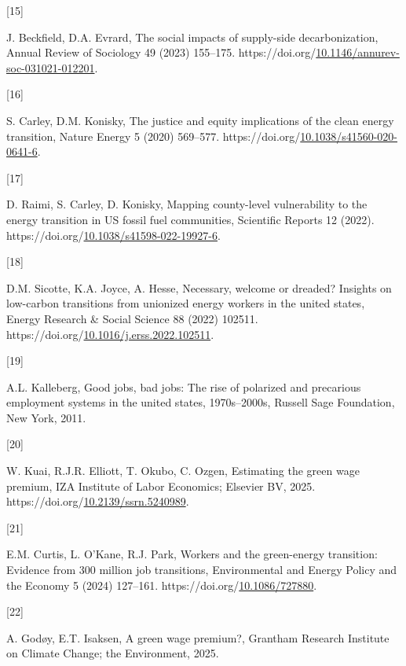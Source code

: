 \documentclass[
  11pt,
]{article}
\newlength{\cslhangindent}
\newlength{\csllabelwidth}
\newenvironment{CSLReferences}[2] %
 {\begin{list}{}{%
  \setlength{\itemindent}{0pt}
  \setlength{\leftmargin}{0pt}
  \setlength{\parsep}{0pt}
  \ifodd #1
   \setlength{\leftmargin}{\cslhangindent}
   \setlength{\itemindent}{-1\cslhangindent}
  \fi
  \setlength{\itemsep}{#2\baselineskip}}}
 {\end{list}}
\newcommand{\CSLLeftMargin}[1]{\parbox[t]{\csllabelwidth}{\strut#1\strut}}
\newcommand{\CSLRightInline}[1]{\parbox[t]{\linewidth - \csllabelwidth}{\strut#1\strut}}
\begin{document}
\begin{CSLReferences}{0}{0}
\CSLLeftMargin{{[}15{]} }%
\CSLRightInline{J. Beckfield, D.A. Evrard, The social impacts of
supply-side decarbonization, Annual Review of Sociology 49 (2023)
155--175.
https://doi.org/\href{https://doi.org/10.1146/annurev-soc-031021-012201}{10.1146/annurev-soc-031021-012201}.}

\CSLLeftMargin{{[}16{]} }%
\CSLRightInline{S. Carley, D.M. Konisky, The justice and equity
implications of the clean energy transition, Nature Energy 5 (2020)
569--577.
https://doi.org/\href{https://doi.org/10.1038/s41560-020-0641-6}{10.1038/s41560-020-0641-6}.}

\CSLLeftMargin{{[}17{]} }%
\CSLRightInline{D. Raimi, S. Carley, D. Konisky, Mapping county-level
vulnerability to the energy transition in US fossil fuel communities,
Scientific Reports 12 (2022).
https://doi.org/\href{https://doi.org/10.1038/s41598-022-19927-6}{10.1038/s41598-022-19927-6}.}

\CSLLeftMargin{{[}18{]} }%
\CSLRightInline{D.M. Sicotte, K.A. Joyce, A. Hesse, Necessary, welcome
or dreaded? Insights on low-carbon transitions from unionized energy
workers in the united states, Energy Research \& Social Science 88
(2022) 102511.
https://doi.org/\href{https://doi.org/10.1016/j.erss.2022.102511}{10.1016/j.erss.2022.102511}.}

\CSLLeftMargin{{[}19{]} }%
\CSLRightInline{A.L. Kalleberg, Good jobs, bad jobs: The rise of
polarized and precarious employment systems in the united states,
1970s--2000s, Russell Sage Foundation, New York, 2011.}

\CSLLeftMargin{{[}20{]} }%
\CSLRightInline{W. Kuai, R.J.R. Elliott, T. Okubo, C. Ozgen, Estimating
the green wage premium, IZA Institute of Labor Economics; Elsevier BV,
2025.
https://doi.org/\href{https://doi.org/10.2139/ssrn.5240989}{10.2139/ssrn.5240989}.}

\CSLLeftMargin{{[}21{]} }%
\CSLRightInline{E.M. Curtis, L. O'Kane, R.J. Park, Workers and the
green-energy transition: Evidence from 300 million job transitions,
Environmental and Energy Policy and the Economy 5 (2024) 127--161.
https://doi.org/\href{https://doi.org/10.1086/727880}{10.1086/727880}.}

\CSLLeftMargin{{[}22{]} }%
\CSLRightInline{A. Godøy, E.T. Isaksen, A green wage premium?, Grantham
Research Institute on Climate Change; the Environment, 2025.}


\end{CSLReferences}
\end{document}
